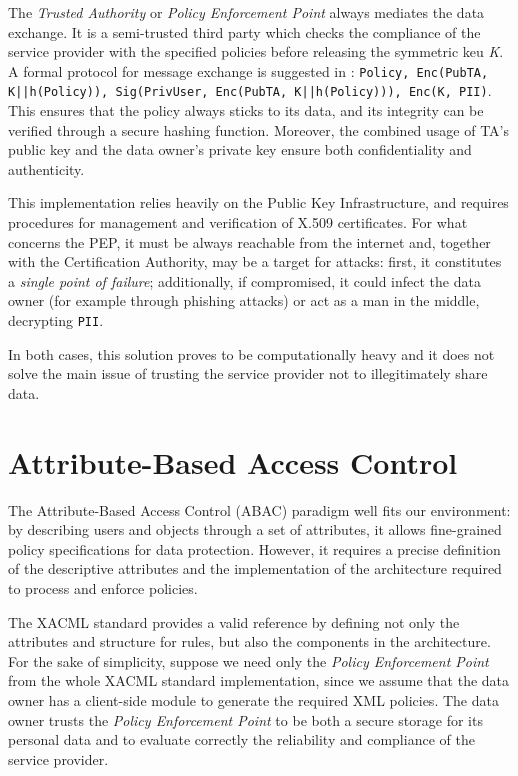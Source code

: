The \textit{Trusted Authority} or \textit{Policy Enforcement Point} always mediates the data exchange. It is a semi-trusted third party which checks the compliance of the service provider with the specified policies before releasing the symmetric keu \textit{K}. A formal protocol for message exchange is suggested in \cite{pearson2011sticky}: \texttt{Policy, Enc(PubTA, K||h(Policy)), Sig(PrivUser, Enc(PubTA, K||h(Policy))), Enc(K, PII)}. This ensures that the policy always sticks to its data, and its integrity can be verified through a secure hashing function. Moreover, the combined usage of TA's public key and the data owner's private key ensure both confidentiality and authenticity. 

This implementation relies heavily on the Public Key Infrastructure, and requires procedures for management and verification of X.509 certificates. For what concerns the PEP, it must be always reachable from the internet and, together with the Certification Authority, may be a target for attacks: first, it constitutes a \textit{single point of failure}; additionally, if compromised, it could infect the data owner (for example through phishing attacks) or act as a man in the middle, decrypting \texttt{PII}.

In both cases, this solution proves to be computationally heavy and it does not solve the main issue of trusting the service provider not to illegitimately share data.

\section{Attribute-Based Access Control}
The Attribute-Based Access Control (ABAC) paradigm well fits our environment: by describing users and objects through a set of attributes, it allows fine-grained policy specifications for data protection. However, it requires a precise definition of the descriptive attributes and the implementation of the architecture required to process and enforce policies.

The XACML standard \cite{standard2005extensible} provides a valid reference by defining not only the attributes and structure for rules, but also the components in the architecture. For the sake of simplicity, suppose we need only the \textit{Policy Enforcement Point} from the whole XACML standard implementation, since we assume that the data owner has a client-side module to generate the required XML policies. The data owner trusts the \textit{Policy Enforcement Point} to be both a secure storage for its personal data and to evaluate correctly the reliability and compliance of the service provider. %

